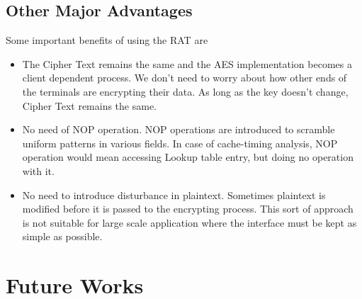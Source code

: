 \documentclass[3p]{elsarticle}
\begin{document}
\subsection{Other Major Advantages}
Some important benefits of using the RAT are
\begin{itemize}
\item The Cipher Text remains the same and the AES implementation becomes a client dependent process. We don't need to worry about how other ends of the terminals are encrypting their data. As long as the key doesn't change, Cipher Text remains the same. 
\item No need of NOP operation. NOP operations are introduced to scramble uniform patterns in various fields. In case of cache-timing analysis, NOP operation would mean accessing Lookup table entry, but doing no operation with it.
\item No need to introduce disturbance in plaintext. Sometimes plaintext is modified before it is passed to the encrypting process. This sort of approach is not suitable for large scale application where the interface must be kept as simple as possible.

\end{itemize}

\section{Future Works}
\end{document}

